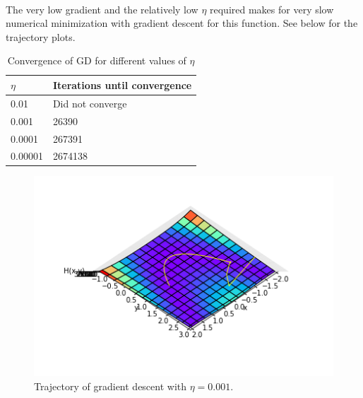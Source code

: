 \documentclass[a4paper,11pt]{article}
\theoremstyle{mytheor}
\begin{document}
\begin{enumerate}
		\\
		The very low gradient and the relatively low $\eta$ required makes for very slow numerical minimization with gradient descent for this function. See below for the trajectory plots.
 
		\begin{table}[h!]
			\centering
			\caption{Convergence of GD for different values of $\eta$}
			\label{conver}
			\begin{tabular}{p{2cm} | p{4.5cm}}
				$\eta$    & Iterations until convergence \\ \hline
				0.01    & Did not converge             \\
				0.001   & 26390                        \\
				0.0001  & 267391                       \\
				0.00001 & 2674138               
			\end{tabular}
		\end{table}\vspace{-0.5cm}
 
		\begin{figure}[h!]
			 \centering
   \includegraphics{trajectory0001y26390}\vspace{-0.5cm}
   \caption{\vspace{-0.2cm} Trajectory of gradient descent with $\eta = 0.001$.}
  \end{figure}\vspace{-0.5cm}
 

\end{enumerate}
\end{document}
